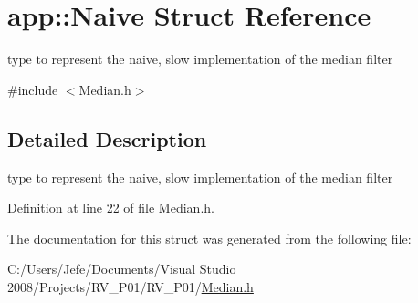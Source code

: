 \hypertarget{structapp_1_1_naive}{}\section{app\+:\+:Naive Struct Reference}
\label{structapp_1_1_naive}


type to represent the \textquotesingle{}naive\textquotesingle{}, slow implementation of the median filter  




{\ttfamily \#include $<$Median.\+h$>$}



\subsection{Detailed Description}
type to represent the \textquotesingle{}naive\textquotesingle{}, slow implementation of the median filter 

Definition at line 22 of file Median.\+h.



The documentation for this struct was generated from the following file\+:\begin{DoxyCompactItemize}
\item 
C\+:/\+Users/\+Jefe/\+Documents/\+Visual Studio 2008/\+Projects/\+R\+V\+\_\+\+P01/\+R\+V\+\_\+\+P01/\hyperlink{_median_8h}{Median.\+h}\end{DoxyCompactItemize}
